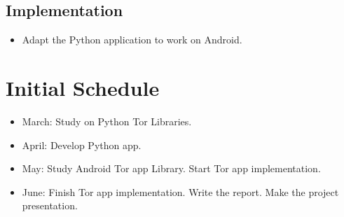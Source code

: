 \documentclass[a4paper, 11pt]{article}
\begin{document}
\subsection*{Implementation}

\begin{itemize}
    \item Adapt the Python application to work on Android.
\end{itemize}

\section*{Initial Schedule}

\begin{itemize}
    \item March: Study on Python Tor Libraries.
    \item April: Develop Python app.
    \item May: Study Android Tor app Library. Start Tor app implementation.
    \item June: Finish Tor app implementation. Write the report. Make the project presentation.
\end{itemize}

\newpage


\end{document}
